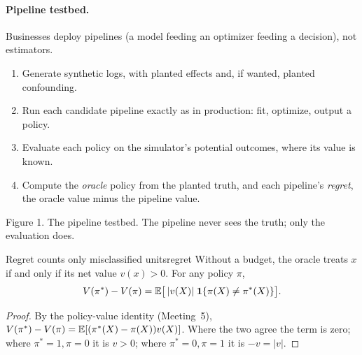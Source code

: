 \documentclass[11pt]{article}
\begin{document}
\paragraph{Pipeline testbed.} Businesses deploy pipelines (a model feeding an optimizer feeding a decision), not estimators.
\begin{enumerate}
  \item Generate synthetic logs, with planted effects and, if wanted, planted confounding.
  \item Run each candidate pipeline exactly as in production: fit, optimize, output a policy.
  \item Evaluate each policy on the simulator's potential outcomes, where its value is known.
  \item Compute the \emph{oracle} policy from the planted truth, and each pipeline's \emph{regret}, the oracle value minus the pipeline value.
\end{enumerate}

\begin{center}

\small Figure 1. The pipeline testbed. The pipeline never sees the truth; only the evaluation does.
\end{center}

\begin{prop}{Regret counts only misclassified units}{regret}
Without a budget, the oracle treats $x$ if and only if its net value $v(x) > 0$. For any policy $\pi$,
\[
  V(\pi^\ast) - V(\pi) = \mathbb{E}\big[\,|v(X)|\;\mathbf{1}\{\pi(X) \ne \pi^\ast(X)\}\big].
\]
\end{prop}
\begin{proof}
By the policy-value identity (Meeting~5), $V(\pi^\ast) - V(\pi) = \mathbb{E}[(\pi^\ast(X) - \pi(X))v(X)]$. Where the two agree the term is zero;
where $\pi^\ast = 1, \pi = 0$ it is $v > 0$; where $\pi^\ast = 0, \pi = 1$ it is $-v = |v|$.
\end{proof}
\end{document}
